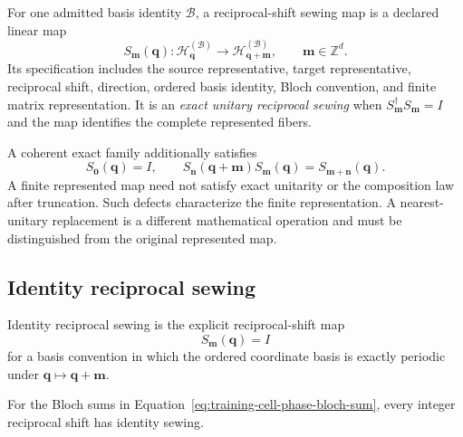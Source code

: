 \begin{definition}
\label{def:training-reciprocal-shift-sewing-map}
For one admitted basis identity \(\mathcal B\), a reciprocal-shift sewing map is
a declared linear map
\begin{equation}
  S_{\mathbf m}(\mathbf q):
  \mathcal H_{\mathbf q}^{(\mathcal B)}
  \longrightarrow
  \mathcal H_{\mathbf q+\mathbf m}^{(\mathcal B)},
  \qquad \mathbf m\in\mathbb Z^d.
  \label{eq:training-reciprocal-sewing-map}
\end{equation}
Its specification includes the source representative, target representative,
reciprocal shift, direction, ordered basis identity, Bloch convention, and
finite matrix representation. It is an \emph{exact unitary reciprocal sewing}
when \(S_{\mathbf m}^{\dagger}S_{\mathbf m}=I\) and the map identifies the
complete represented fibers.
\end{definition}

A coherent exact family additionally satisfies
\begin{equation}
  S_{\mathbf 0}(\mathbf q)=I,
  \qquad
  S_{\mathbf n}(\mathbf q+\mathbf m)
  S_{\mathbf m}(\mathbf q)
  =S_{\mathbf m+\mathbf n}(\mathbf q).
  \label{eq:training-sewing-composition-law}
\end{equation}
A finite represented map need not satisfy exact unitarity or the composition
law after truncation. Such defects characterize the finite representation. A
nearest-unitary replacement is a different mathematical operation and must be
distinguished from the original represented map.

\subsection{Identity reciprocal sewing}

\begin{definition}
\label{def:training-identity-reciprocal-sewing}
Identity reciprocal sewing is the explicit reciprocal-shift map
\begin{equation}
  S_{\mathbf m}(\mathbf q)=I
\end{equation}
for a basis convention in which the ordered coordinate basis is exactly
periodic under \(\mathbf q\mapsto\mathbf q+\mathbf m\).
\end{definition}

\begin{proposition}
\label{prop:training-cell-phase-identity-sewing}
For the Bloch sums in
Equation~\eqref{eq:training-cell-phase-bloch-sum}, every integer reciprocal
shift has identity sewing.
\end{proposition}

